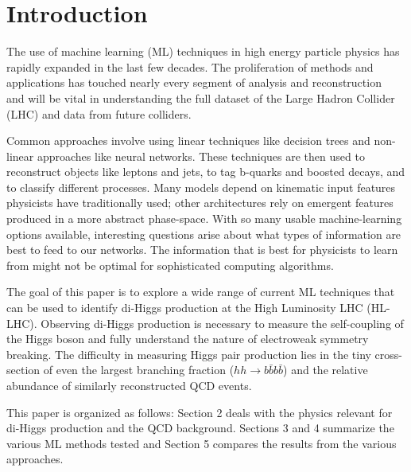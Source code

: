 \section{Introduction}
\label{sec:intro}

The use of machine learning (ML) techniques in high energy particle physics has rapidly expanded in the last few decades. The proliferation of methods and applications has touched nearly every segment of analysis and reconstruction~\cite{albertsson2018machine} and will be vital in understanding the full dataset of the Large Hadron Collider (LHC) and data from future colliders.

Common approaches involve using linear techniques like decision trees and non-linear approaches like neural networks. These techniques are then used to reconstruct objects like leptons and jets, to tag b-quarks and boosted decays, and to classify different processes. Many models depend on kinematic input features physicists have traditionally used; other architectures rely on emergent features produced in a more abstract phase-space. With so many usable machine-learning options available, interesting questions arise about what types of information are best to feed to our networks. The information that is best for physicists to learn from might not be optimal for sophisticated computing algorithms.

The goal of this paper is to explore a wide range of current ML techniques that can be used to identify di-Higgs production at the High Luminosity LHC (HL-LHC). Observing di-Higgs production is necessary to measure the self-coupling of the Higgs boson and fully understand the nature of electroweak symmetry breaking. The difficulty in measuring Higgs pair production lies in the tiny cross-section of even the largest branching fraction ($hh\rightarrow b\bar{b}b\bar{b}$) and the relative abundance of similarly reconstructed QCD events.

This paper is organized as follows: Section 2 deals with the physics relevant for di-Higgs production and the QCD background. Sections 3 and 4 summarize the various ML methods tested and Section 5 compares the results from the various approaches.

